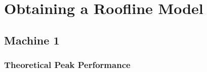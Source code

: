 
\lstset{
	basicstyle=\small,
	language=C
}

\ttfamily\small

\section{Obtaining a Roofline Model}

\subsection{Machine 1}

\subsubsection{Theoretical Peak Performance}
